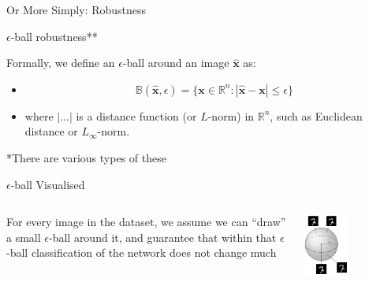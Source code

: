 \documentclass[t,compress,aspectratio=169]{beamer}
\begin{document}
\begin{frame}{Or More Simply: Robustness}

\begin{alertblock}{$\epsilon$-ball robustness**}

Formally, we define an $\epsilon$-ball around an image $\hat{\mathbf{x}}$ as:


\begin{itemize}
    \item[] $$\mathbb{B}(\hat{\mathbf{x}}, \epsilon) = \{ \mathbf{x} \in \mathbb{R}^n: |\hat{\mathbf{x}}-\mathbf{x}| \leq \epsilon \}$$
    \item [] where $| ... |$ is a distance function (or $L$-norm) in $\mathbb{R}^n$,
such as Euclidean distance or $L_{\infty}$-norm.
\end{itemize}
\end{alertblock}
 \vfill
 \footnotesize **There are various types of these
\end{frame}

\begin{frame}{$\epsilon$-ball Visualised}

 \begin{columns}
        \begin{column}{0.35\textwidth}
        \begin{center}
                For every image in the dataset, we assume we can “draw” a small $\epsilon$-ball around it, and guarantee that within that $\epsilon$-ball classification of the network does not change much
        \end{center}

        \end{column}
        \begin{column}{0.6\textwidth}
             \begin{center}
             \vspace{-1em}
    \centering\includegraphics[width=0.45\textwidth]{img/epsballmnist.png}
                 
             \end{center}
        \end{column}
\end{columns}
 

    
\end{frame}
\end{document}
